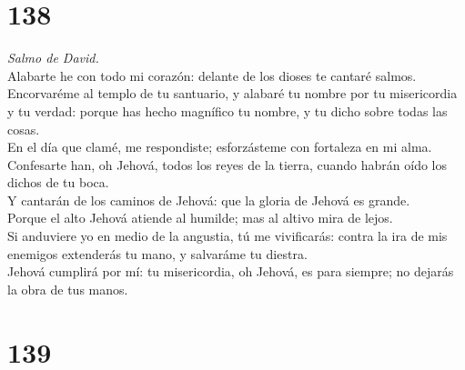 \hypertarget{section-137}{%
\section{138}\label{section-137}}

 \emph{Salmo de David.}\\
Alabarte he con todo mi corazón: delante de los dioses te cantaré
salmos.\\
 Encorvaréme al templo de tu santuario, y alabaré tu nombre
por tu misericordia y tu verdad: porque has hecho magnífico tu nombre, y
tu dicho sobre todas las cosas.\\
 En el día que clamé, me respondiste; esforzásteme con
fortaleza en mi alma.\\
 Confesarte han, oh Jehová, todos los reyes de la tierra,
cuando habrán oído los dichos de tu boca.\\
 Y cantarán de los caminos de Jehová: que la gloria de
Jehová es grande.\\
 Porque el alto Jehová atiende al humilde; mas al altivo
mira de lejos.\\
 Si anduviere yo en medio de la angustia, tú me vivificarás:
contra la ira de mis enemigos extenderás tu mano, y salvaráme tu
diestra.\\
 Jehová cumplirá por mí: tu misericordia, oh Jehová, es para
siempre; no dejarás la obra de tus manos.

\hypertarget{section-138}{%
\section{139}\label{section-138}}

